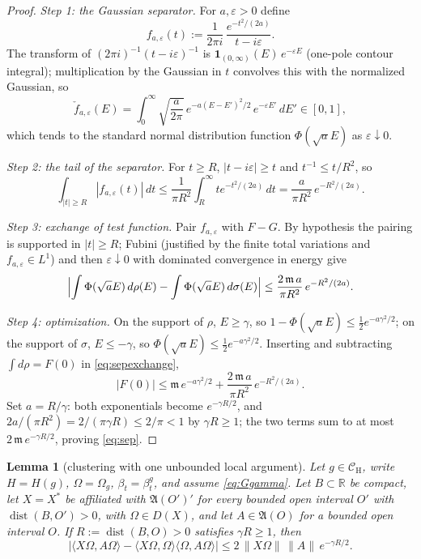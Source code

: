 \documentclass[11pt,a4paper]{article}
\theoremstyle{plain}
\newtheorem{lemma}[theorem]{Lemma}
\theoremstyle{definition}
\theoremstyle{plain}
\theoremstyle{definition}
\newcommand{\R}{\mathbb{R}}
\newcommand{\A}{\mathfrak{A}}
\newcommand{\CH}{\mathcal{C}_{\mathrm H}}
\newcommand{\Om}{\Omega}
\newcommand{\ip}[2]{\langle #1,#2\rangle}
\DeclareMathOperator{\dist}{dist}
\begin{document}
\begin{proof}
\emph{Step 1: the Gaussian separator.} For $a,\varepsilon>0$ define
\[
 f_{a,\varepsilon}(t):=\frac{1}{2\pi i}\,\frac{e^{-t^2/(2a)}}{t-i\varepsilon} .
\]
The transform of $(2\pi i)^{-1}(t-i\varepsilon)^{-1}$ is
$\mathbf 1_{(0,\infty)}(E)\,e^{-\varepsilon E}$ (one-pole contour integral);
multiplication by the Gaussian in $t$ convolves this with the normalized Gaussian, so
\begin{equation}
 \check f_{a,\varepsilon}(E)
 =\int_0^\infty\sqrt{\frac a{2\pi}}\,e^{-a(E-E')^2/2}\,e^{-\varepsilon E'}\,dE'
 \in[0,1],
 \label{eq:septransform}
\end{equation}
which tends to the standard normal distribution function $\Phi(\sqrt aE)$ as
$\varepsilon\downarrow0$.

\emph{Step 2: the tail of the separator.} For $t\ge R$, $|t-i\varepsilon|\ge t$ and
$t^{-1}\le t/R^2$, so
\begin{equation}
 \int_{|t|\ge R}|f_{a,\varepsilon}(t)|\,dt
 \le\frac1{\pi R^2}\int_R^\infty te^{-t^2/(2a)}\,dt
 =\frac{a}{\pi R^2}\,e^{-R^2/(2a)} .
 \label{eq:septail}
\end{equation}

\emph{Step 3: exchange of test function.} Pair $f_{a,\varepsilon}$ with $F-G$. By
hypothesis the pairing is supported in $|t|\ge R$; Fubini (justified by the finite total
variations and $f_{a,\varepsilon}\in L^1$) and then $\varepsilon\downarrow0$ with
dominated convergence in energy give
\begin{equation}
 \Bigl|\int\Phi(\sqrt aE)\,d\rho(E)-\int\Phi(\sqrt aE)\,d\sigma(E)\Bigr|
 \le\frac{2\,\mathfrak m\,a}{\pi R^2}\,e^{-R^2/(2a)} .
 \label{eq:sepexchange}
\end{equation}

\emph{Step 4: optimization.} On the support of $\rho$, $E\ge\gamma$, so
$1-\Phi(\sqrt aE)\le\tfrac12e^{-a\gamma^2/2}$; on the support of $\sigma$, $E\le-\gamma$,
so $\Phi(\sqrt aE)\le\tfrac12e^{-a\gamma^2/2}$. Inserting and subtracting
$\int d\rho=F(0)$ in \eqref{eq:sepexchange},
\[
 |F(0)|\le \mathfrak m\,e^{-a\gamma^2/2}
 +\frac{2\,\mathfrak m\,a}{\pi R^2}\,e^{-R^2/(2a)} .
\]
Set $a=R/\gamma$: both exponentials become $e^{-\gamma R/2}$, and
$2a/(\pi R^2)=2/(\pi\gamma R)\le2/\pi<1$ by $\gamma R\ge1$; the two terms sum to at most
$2\,\mathfrak m\,e^{-\gamma R/2}$, proving \eqref{eq:sep}.
\end{proof}

\begin{lemma}[clustering with one unbounded local argument]\label{lem:cluster}
Let $g\in\CH$, write $H=H(g)$, $\Om=\Om_g$, $\beta_t=\beta^g_t$, and assume
\eqref{eq:Ggamma}. Let $B\subset\R$ be compact, let $X=X^*$ be affiliated with $\A(O')'$ for
every bounded open interval $O'$ with $\dist(B,O')>0$, with $\Om\in D(X)$, and let
$A\in\A(O)$ for a bounded open interval $O$. If $R:=\dist(B,O)>0$ satisfies $\gamma R\ge1$, then
\begin{equation}
 \bigl|\ip{X\Om}{A\Om}-\ip{X\Om}{\Om}\ip{\Om}{A\Om}\bigr|
 \le2\,\|X\Om\|\,\|A\|\,e^{-\gamma R/2} .
 \label{eq:cluster}
\end{equation}
\end{lemma}
\end{document}
